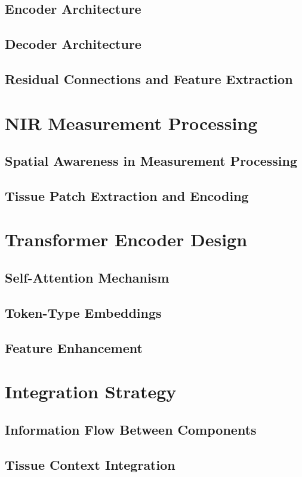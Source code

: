 \documentclass[12pt,a4paper]{report}
\begin{document}
\subsection{Encoder Architecture}
\subsection{Decoder Architecture}
\subsection{Residual Connections and Feature Extraction}
\section{NIR Measurement Processing}
\subsection{Spatial Awareness in Measurement Processing}
\subsection{Tissue Patch Extraction and Encoding}
\section{Transformer Encoder Design}
\subsection{Self-Attention Mechanism}
\subsection{Token-Type Embeddings}
\subsection{Feature Enhancement}
\section{Integration Strategy}
\subsection{Information Flow Between Components}
\subsection{Tissue Context Integration}
\end{document}
